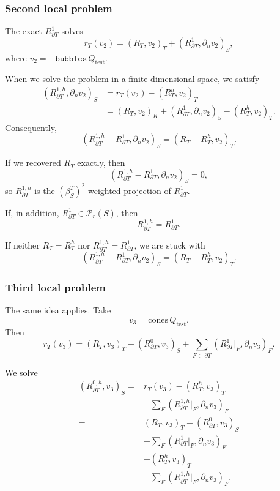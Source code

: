 \documentclass[12pt,a4paper]{article}
\newcommand{\PP}{\mathcal{P}}
\newcommand{\qtest}{Q_{\mathrm{test}}}
\newcommand{\cones}{\mathrm{cones}}
\newcommand{\dn}{\partial_n}
\newcommand{\bubbles}{\texttt{bubbles}}
\newcommand{\Rone}{R_{\partial T}^{1}}
\newcommand{\Rzero}{R_{\partial T}^{0}}
\newcommand{\Roneh}{R_{\partial T}^{1,h}}
\newcommand{\Rzeroh}{R_{\partial T}^{0,h}}
\begin{document}
\subsubsection*{Second local problem}
The exact $\Rone$ solves
\begin{equation}
    r_T(v_2)=(R_T,v_2)_T+(\Rone,\dn v_2)_S,
\end{equation}
where $v_2=-\bubbles\,\qtest$.

When we solve the problem in a finite-dimensional space, we satisfy
\begin{align}
    (\Roneh,\dn v_2)_S
       &=r_T(v_2)-(R_T^h,v_2)_T\\
       &=(R_T,v_2)_K+(\Rone,\dn v_2)_S
                                -(R_T^h,v_2)_T.
\end{align}
Consequently,
\begin{equation}
    (\Roneh-\Rone,\dn v_2)_S
      =(R_T-R_T^h,v_2)_T.
\end{equation}

If we recovered $R_T$ exactly, then
\begin{equation}
    (\Roneh-\Rone,\dn v_2)_S=0,
\end{equation}
so $\Roneh$ is the $(\beta_S^T)^2$-weighted projection of $\Rone$.

If, in addition, $\Rone\in\PP_r(S)$, then
\begin{equation}
    \Roneh=\Rone.
\end{equation}

If neither $R_T=R_T^h$ nor $\Roneh=\Rone$, we are stuck with
\begin{equation}
    (\Roneh-\Rone,\dn v_2)_S
      =(R_T-R_T^h,v_2)_T.
\end{equation}

\subsubsection*{Third local problem}
The same idea applies. Take
\begin{equation}
    v_3=\cones\,\qtest.
\end{equation}
Then
\begin{equation}
    r_T(v_3)
      =(R_T,v_3)_T+(\Rzero,v_3)_S
       +\sum_{F\subset\partial T}(\Rone|_F,\dn v_3)_F.
\end{equation}

We solve
\begin{align}
    (\Rzeroh,v_3)_S
      ={}&r_T(v_3)-(R_T^h,v_3)_T\\
         &-\sum_F(\Roneh|_F,\dn v_3)_F\\
      ={}&(R_T,v_3)_T+(\Rzero,v_3)_S\\
         &+\sum_F(\Rone|_F,\dn v_3)_F\\
         &-(R_T^h,v_3)_T\\
         &-\sum_F(\Roneh|_F,\dn v_3)_F.
\end{align}
\end{document}
